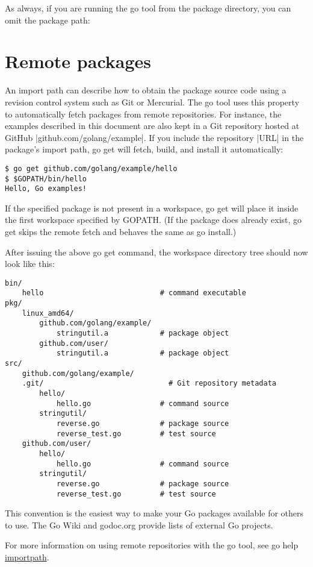 As always, if you are running the go tool from the package directory, you can omit the package path:



\section{Remote packages}

An import path can describe how to obtain the package source code using a revision control system such as Git or Mercurial. The go tool uses this property to automatically fetch packages from remote repositories. For instance, the examples described in this document are also kept in a Git repository hosted at GitHub |github.com/golang/example|. If you include the repository |URL| in the package's import path, go get will fetch, build, and install it automatically:

\begin{verbatim}
$ go get github.com/golang/example/hello
$ $GOPATH/bin/hello
Hello, Go examples!
\end{verbatim}

If the specified package is not present in a workspace, go get will place it inside the first workspace specified by GOPATH. (If the package does already exist, go get skips the remote fetch and behaves the same as go install.)

After issuing the above go get command, the workspace directory tree should now look like this:

\begin{verbatim}
bin/
    hello                           # command executable
pkg/
    linux_amd64/
        github.com/golang/example/
            stringutil.a            # package object
        github.com/user/
            stringutil.a            # package object
src/
    github.com/golang/example/
	.git/                             # Git repository metadata
        hello/
            hello.go                # command source
        stringutil/
            reverse.go              # package source
            reverse_test.go         # test source
    github.com/user/
        hello/
            hello.go                # command source
        stringutil/
            reverse.go              # package source
            reverse_test.go         # test source
\end{verbatim}

This convention is the easiest way to make your Go packages available for others to use. The Go Wiki and godoc.org provide lists of external Go projects.

For more information on using remote repositories with the go tool, see go help \href{https://golang.org/cmd/go/\#hdr-Remote_import_paths}{importpath}.



